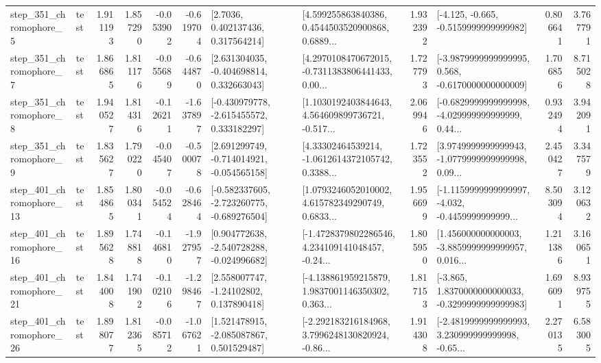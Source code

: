 \begin{tabular}{llrrrrllrlrr}
   step\_351\_chromophore\_5 &      test &      1.911193 &    1.857290 &     -0.053902 & -0.619704 &          [2.7036, 0.402137436, 0.317564214] &  [4.599255863840386, 0.4544503520900868, 0.6889... &       1.932392 &              [-4.125, -0.665, -0.5159999999999982] &            0.806641 &          3.767791 \\
   step\_351\_chromophore\_7 &      test &      1.866865 &    1.811176 &     -0.055689 & -0.644870 &    [2.631304035, -0.404698814, 0.332663043] &  [4.2970108470672015, -0.7311383806441433, 0.00... &       1.727793 &  [-3.9879999999999995, 0.568, -0.6170000000000009] &            1.706856 &          8.715028 \\
   step\_351\_chromophore\_8 &      test &      1.940527 &    1.814316 &     -0.126211 & -1.637897 &   [-0.430979778, -2.615455572, 0.333182297] &  [1.1030192403844643, 4.564609899736721, -0.517... &       2.069946 &  [-0.6829999999999998, -4.029999999999999, 0.44... &            0.932494 &          3.942091 \\
   step\_351\_chromophore\_9 &      test &      1.835627 &    1.790220 &     -0.045407 & -0.500078 &   [2.691299749, -0.714014921, -0.054565158] &  [4.33302464539214, -1.0612614372105742, 0.3388... &       1.723552 &  [3.9749999999999943, -1.0779999999999998, 0.09... &            2.450427 &          3.347579 \\
  step\_401\_chromophore\_13 &      test &      1.854865 &    1.800341 &     -0.054524 & -0.628464 &  [-0.582337605, -2.723260775, -0.689276504] &  [1.0793246052010002, 4.615782349290749, 0.6833... &       1.956699 &  [-1.1159999999999997, -4.032, -0.4459999999999... &            8.503094 &          3.120632 \\
  step\_401\_chromophore\_16 &      test &      1.895628 &    1.748818 &     -0.146810 & -1.927957 &   [0.904772638, -2.540728288, -0.024996682] &  [-1.4728379802286546, 4.234109141048457, -0.24... &       1.805950 &  [1.456000000000003, -3.8859999999999957, 0.016... &            1.211386 &          3.160651 \\
  step\_401\_chromophore\_21 &      test &      1.844008 &    1.741902 &     -0.102106 & -1.298467 &     [2.558007747, -1.24102802, 0.137890418] &  [-4.138861959215879, 1.9837001146350302, 0.363... &       1.817153 &  [-3.865, 1.8370000000000033, -0.3299999999999983] &            1.696091 &          8.939755 \\
  step\_401\_chromophore\_26 &      test &      1.898077 &    1.812365 &     -0.085712 & -1.067621 &    [1.521478915, -2.085087867, 0.501529487] &  [-2.292183216184968, 3.7996248130820924, -0.86... &       1.914308 &  [-2.4819999999999993, 3.230999999999998, -0.65... &            2.270135 &          6.583005 \\

\end{tabular}
